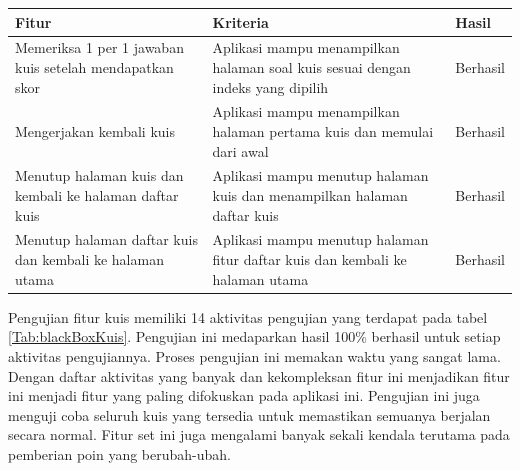 \begin{table}[H]
	\begin{tabular}{|p{}|p{}|p{}|}
		\hline
		 \centering\textbf{Fitur} & \multicolumn{1}{m{0.45\textwidth}|}{\centering \textbf{Kriteria}}&  \multicolumn{1}{m{0.1\textwidth}|}{\centering \textbf{Hasil}}\\
		 \hline
		Memeriksa 1 per 1 jawaban kuis setelah mendapatkan skor
		& Aplikasi mampu menampilkan halaman soal kuis sesuai dengan indeks yang dipilih 
		& Berhasil\\
		\hline
		Mengerjakan kembali kuis
		& Aplikasi mampu menampilkan halaman pertama kuis dan memulai dari awal
		& Berhasil\\
		\hline
		Menutup halaman kuis dan kembali ke halaman daftar kuis
		& Aplikasi mampu menutup halaman kuis dan menampilkan halaman daftar kuis
		& Berhasil\\
		\hline
		Menutup halaman daftar kuis dan kembali ke halaman utama
		& Aplikasi mampu menutup halaman fitur daftar kuis dan kembali ke halaman utama 
		& Berhasil\\
		\hline
	\end{tabular}
\end{table}
Pengujian fitur kuis memiliki 14 aktivitas pengujian yang terdapat pada tabel \ref*{Tab:blackBoxKuis}.
Pengujian ini medaparkan hasil 100\% berhasil untuk setiap aktivitas pengujiannya. Proses pengujian ini memakan waktu yang sangat lama.
Dengan daftar aktivitas yang banyak dan kekompleksan fitur ini menjadikan fitur ini menjadi fitur yang paling difokuskan pada aplikasi ini.
Pengujian ini juga menguji coba seluruh kuis yang tersedia untuk memastikan semuanya berjalan secara normal.
Fitur set ini juga mengalami banyak sekali kendala terutama pada pemberian poin yang berubah-ubah. 
